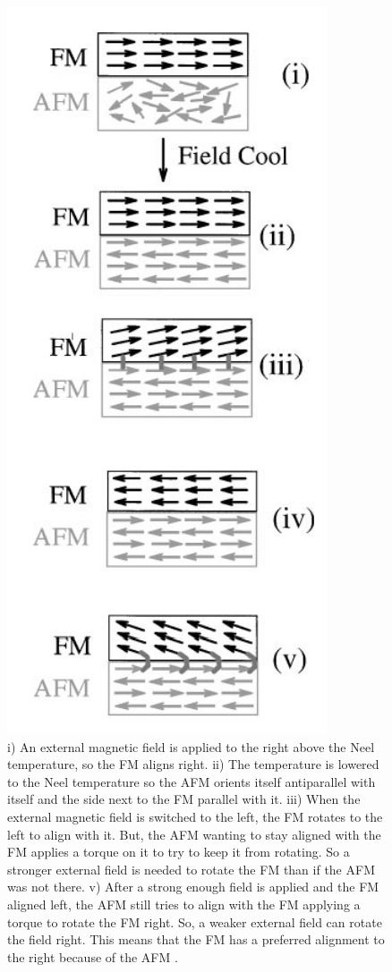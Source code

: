 \documentclass[ notitlepage, numerical, 11pt]{revtex4-1} %
\begin{document}
\begin{figure}[H]
\centerline{\includegraphics[scale=.55]{exchange.png}}
\caption{i) An external magnetic field is applied to the right above the Neel temperature, so the FM aligns right. ii) The temperature is lowered to the Neel temperature so the AFM orients itself antiparallel with itself and the side next to the FM parallel with it. iii) When the external magnetic field is switched to the left, the FM rotates to the left to align with it. But, the AFM wanting to stay aligned with the FM applies a torque on it to try to keep it from rotating. So a stronger external field is needed to rotate the FM than if the AFM was not there. v) After a strong enough field is applied and the FM aligned left, the AFM still tries to align with the FM applying a torque to rotate the FM right. So, a weaker external field can rotate the field right. This means that the FM has a preferred alignment to the right because of the AFM \cite{schull}.}
\label{exchange}
\end{figure}
\end{document}
